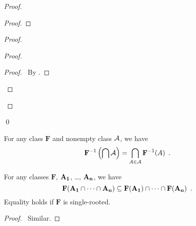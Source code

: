 \begin{proof}
    \pf
    \begin{proof}
    \end{proof}
    \begin{proof}
        \begin{proof}
            \begin{proof}
                \pf\ By .
            \end{proof}
        \end{proof}
    \end{proof}
    \qed
\end{proof}

\begin{corollary}[Pairing]
    For any class $\mathbf{F}$ and nonempty class $\mathbf{\AA}$, we have
    \[ \inv{\mathbf{F}} \left( \bigcap \mathbf{\AA} \right) = \bigcap_{A \in \mathbf{\AA}} \inv{\mathbf{F}}(A) \enspace . \]
\end{corollary}

\begin{theorem}[Pairing]
    For any classes $\mathbf{F}$, $\mb{A_1}$, \ldots, $\mb{A_n}$, we have
    \[ \mathbf{F}(\mb{A_1} \cap \cdots \cap \mb{A_n}) \subseteq \mathbf{F}(\mb{A_1}) \cap \cdots \cap \mathbf{F}(\mb{A_n}) \enspace . \]
    Equality holds if $\mathbf{F}$ is single-rooted.
\end{theorem}

\begin{proof}
    \pf\ Similar.
\end{proof}

